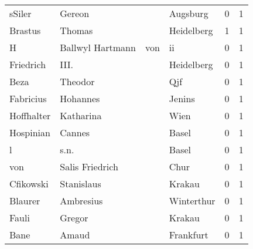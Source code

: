 \documentclass[10pt,a4paper,landscape]{article}
\begin{document}
\begin{longtable}{llllrr}
                   sSiler &                             Gereon &             &                                    Augsburg &          0 &         1 \\
                  Brastus &                             Thomas &             &                                  Heidelberg &          1 &         1 \\
                        H &                   Ballwyl Hartmann &         von &                                          ii &          0 &         1 \\
                Friedrich &                               III. &             &                                  Heidelberg &          0 &         1 \\
                     Beza &                            Theodor &             &                                         Qjf &          0 &         1 \\
                Fabricius &                           Hohannes &             &                                      Jenins &          0 &         1 \\
               Hoffhalter &                          Katharina &             &                                        Wien &          0 &         1 \\
                Hospinian &                             Cannes &             &                                       Basel &          0 &         1 \\
                        l &                               s.n. &             &                                       Basel &          0 &         1 \\
                      von &                    Salis Friedrich &             &                                        Chur &          0 &         1 \\
                Cfikowski &                         Stanislaus &             &                                      Krakau &          0 &         1 \\
                  Blaurer &                          Ambresius &             &                                  Winterthur &          0 &         1 \\
                    Fauli &                             Gregor &             &                                      Krakau &          0 &         1 \\
                     Bane &                              Amaud &             &                                   Frankfurt &          0 &         1 \\

\end{longtable}
\end{document}
